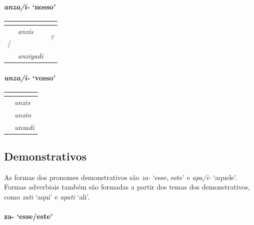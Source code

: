 \paragraph{\emph{anza/i-} `nosso'}

\begin{center}
	\begin{tabular}[c]{lll}
		\toprule
		                      & \Sg{}\emph{}    & \Pl{}\emph{}                \\
		\midrule
		\Nom{} \Com{}         & \emph{anzis}    & \multirow{2}{4em}{\emph{?}} \\
		\Nom{}/\Acu{} \Neut{} & \emph{}         & \emph{anzaya}               \\
		\Abl{}                & \emph{anziyadi} & \emph{}                     \\
		\bottomrule
	\end{tabular}
\end{center}


\paragraph{\emph{unza/i-} `vosso'}

\begin{center}
	\begin{tabular}[c]{ll}
		\toprule
		              & \Sg{}\emph{}  \\
		\midrule
		\Nom{} \Com{} & \emph{unzis}  \\
		\Acu{} \Com{} & \emph{unzin}  \\
		\Abl{}        & \emph{unzadi} \\
		\bottomrule
	\end{tabular}
\end{center}

\subsection{Demonstrativos}
As formas dos pronomes demonstrativos são \emph{za-} `esse, este' e
\emph{apa\slash{}i-} `aquele'.
Formas adverbiais também são formadas a partir dos temas dos demonstrativos,
como \emph{zati} `aqui' e \emph{apati} `ali'.

\paragraph{za- `esse/este'}

